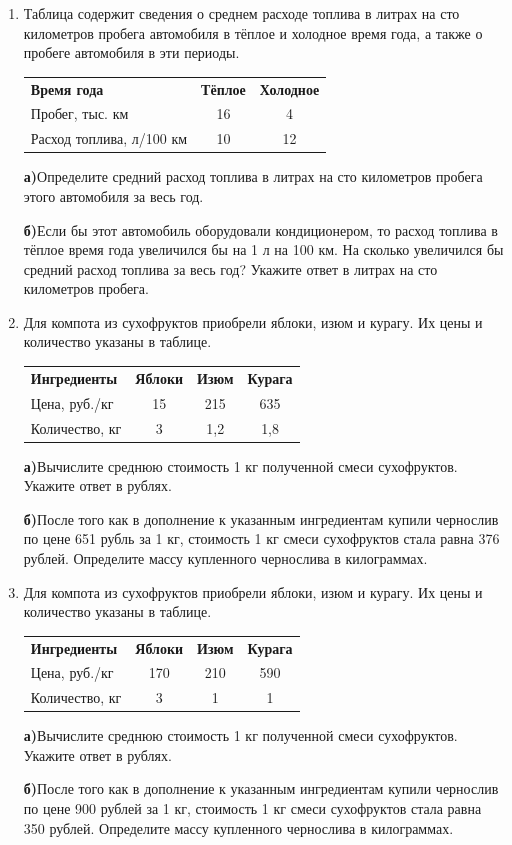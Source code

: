 \documentclass[a4paper,12pt]{article}
\newcommand{\taskspace}{\par\vspace{0.42cm}}
\newcommand{\subtask}[2]{\par\medskip\textbf{#1}\enspace #2\par\vspace{0.22cm}}
\begin{document}
\begin{enumerate}[resume]
\item Таблица содержит сведения о среднем расходе топлива в литрах на сто километров пробега автомобиля в тёплое и холодное время года, а также о пробеге автомобиля в эти периоды.
\begin{center}
\renewcommand{\arraystretch}{1.22}
\begin{tabular}{@{}lcc@{}}\textbf{Время года} & \textbf{Тёплое} & \textbf{Холодное} \\
Пробег, тыс. км & 16 & 4 \\
Расход топлива, л/100 км & 10 & 12\end{tabular}
\end{center}
\subtask{а)}{Определите средний расход топлива в литрах на сто километров пробега этого автомобиля за весь год.}
\subtask{б)}{Если бы этот автомобиль оборудовали кондиционером, то расход топлива в тёплое время года увеличился бы на 1 л на 100 км. На сколько увеличился бы средний расход топлива за весь год? Укажите ответ в литрах на сто километров пробега.}

\taskspace

\item Для компота из сухофруктов приобрели яблоки, изюм и курагу. Их цены и количество указаны в таблице.
\begin{center}
\renewcommand{\arraystretch}{1.22}
\begin{tabular}{@{}lccc@{}}\textbf{Ингредиенты} & \textbf{Яблоки} & \textbf{Изюм} & \textbf{Курага} \\
Цена, руб./кг & 15 & 215 & 635 \\
Количество, кг & 3 & 1,2 & 1,8\end{tabular}
\end{center}
\subtask{а)}{Вычислите среднюю стоимость 1 кг полученной смеси сухофруктов. Укажите ответ в рублях.}
\subtask{б)}{После того как в дополнение к указанным ингредиентам купили чернослив по цене 651 рубль за 1 кг, стоимость 1 кг смеси сухофруктов стала равна 376 рублей. Определите массу купленного чернослива в килограммах.}

\taskspace

\item Для компота из сухофруктов приобрели яблоки, изюм и курагу. Их цены и количество указаны в таблице.
\begin{center}
\renewcommand{\arraystretch}{1.22}
\begin{tabular}{@{}lccc@{}}\textbf{Ингредиенты} & \textbf{Яблоки} & \textbf{Изюм} & \textbf{Курага} \\
Цена, руб./кг & 170 & 210 & 590 \\
Количество, кг & 3 & 1 & 1\end{tabular}
\end{center}
\subtask{а)}{Вычислите среднюю стоимость 1 кг полученной смеси сухофруктов. Укажите ответ в рублях.}
\subtask{б)}{После того как в дополнение к указанным ингредиентам купили чернослив по цене 900 рублей за 1 кг, стоимость 1 кг смеси сухофруктов стала равна 350 рублей. Определите массу купленного чернослива в килограммах.}


\end{enumerate}
\end{document}
